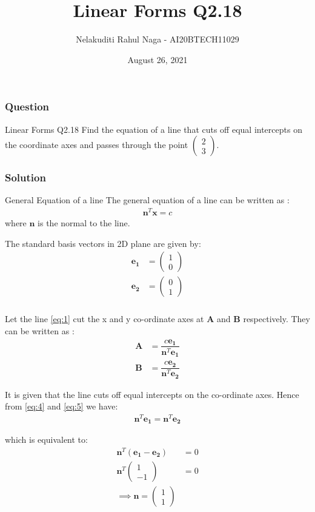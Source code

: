 \documentclass{beamer}
\title{Linear Forms Q2.18}
\author{Nelakuditi Rahul Naga - AI20BTECH11029}
\date{August 26, 2021 }
\newcommand{\myvec}[1]{\ensuremath{\begin{pmatrix}#1\end{pmatrix}}}
\renewcommand{\vec}[1]{\mathbf{#1}}
\begin{document}
\begin{frame}
\titlepage
\end{frame}

\begin{frame}
\frametitle{Question}
\begin{block}{Linear Forms Q2.18}
Find the equation of a line that cuts off equal intercepts on the coordinate axes and passes through the point $\myvec{2 \\ 3}$.
\end{block}
\end{frame}

\begin{frame}
\frametitle{Solution}
\begin{block}{General Equation of a line}
The general equation of a line can be written as :
\begin{align}
\vec{n}^T\vec{x}=c \label{eq:1}  
\end{align}
where $\vec{n}$ is the normal to the line.
\end{block}
The standard basis vectors in 2D plane are given by:
\begin{align}
\vec{e_{1}} &= \myvec{1 \\ 0}
\\\vec{e_{2}} &= \myvec{0 \\ 1}
\end{align}
\end{frame}

\begin{frame}
\frametitle{}
Let the line \eqref{eq:1} cut the x and y co-ordinate axes at $\vec{A}$ and $\vec{B}$ respectively. They can be written as :
\begin{align}
\vec{A} &= \dfrac{c\vec{e_{1}}}{\vec{n}^T\vec{e_{1}}}\label{eq:4}\\
\vec{B} &= \dfrac{c\vec{e_{2}}}{\vec{n}^T\vec{e_{2}}}\label{eq:5}
\end{align}

It is given that the line cuts off equal intercepts on the co-ordinate axes. Hence from \eqref{eq:4} and \eqref{eq:5} we have:
\begin{align}
\vec{n}^T\vec{e_{1}} = \vec{n}^T\vec{e_{2}}
\end{align}

which is equivalent to:
\begin{align}
\vec{n}^T(\vec{e_{1}}-\vec{e_{2}}) &= 0\\
\vec{n}^T\myvec{1 \\ -1} &= 0\\
\implies \vec{n} = \myvec{1 \\ 1}\label{eq:6}
\end{align}
\end{frame}
\end{document}
